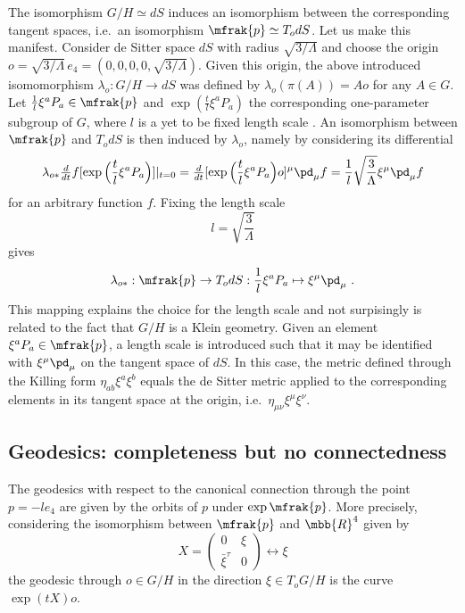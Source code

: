 \documentclass[11pt]{article}
\begin{document}
The isomorphism $G/H \simeq dS$ induces an isomorphism between 
the corresponding tangent spaces, i.e.~an isomorphism $\mfrak{p} 
\simeq T_odS$. Let us make this manifest. Consider de Sitter 
space $dS$ with radius $\sqrt{3/\Lambda}$ and choose the origin 
$o = \sqrt{3/\Lambda}\,e_4 = (0,0,0,0,\sqrt{3/\Lambda})$.  Given 
this origin, the above introduced isomomorphism $\lambda_o : G/H 
\to dS$ was defined by $\lambda_o(\pi(A)) = Ao$ for any $A \in 
G$.  Let $\tfrac{1}{l}\xi^a P_a \in \mfrak{p}$ and 
$\exp(\tfrac{t}{l}\xi^a P_a)$ the corresponding one-parameter 
subgroup of $G$, where $l$ is a yet to be fixed length scale 
\cite{Wise:2006sm}. An isomorphism between $\mfrak{p}$ and 
$T_odS$ is then induced by $\lambda_o$, namely by considering its 
differential
%
\begin{displaymath}
	\lambda_{o\ast}\tfrac{d}{dt}f[\exp\Big(\frac{t}{l}\xi^a 
	P_a\Big)]|_{t=0} = \tfrac{d}{dt}[\exp\Big(\frac{t}{l}\xi^a 
	P_a\Big)o]^\mu \pd_\mu f = 
	\frac{1}{l}\sqrt{\frac{3}{\Lambda}}\xi^\mu\pd_\mu f
\end{displaymath}
for an arbitrary function $f$. Fixing the length scale 
\cite{Wise:2006sm}
\begin{displaymath}
	l = \sqrt{\frac{3}{\Lambda}}
\end{displaymath}
gives
%
\begin{equation}
	\lambda_{o\ast} : \mfrak{p} \to T_odS : \frac{1}{l}\xi^a P_a 
	\mapsto \xi^\mu \pd_\mu~.
\end{equation}
This mapping explains the choice for the length scale and not 
surpisingly is related to the fact that $G/H$ is a Klein 
geometry. Given an element $\xi^a P_a \in \mfrak{p}$, a length 
scale is introduced such that it may be identified with $\xi^\mu 
\pd_\mu$ on the tangent space of $dS$. In this case, the metric 
defined through the Killing form $\eta_{ab}\xi^a\xi^b$ equals the 
de Sitter metric applied to the corresponding elements in its 
tangent space at the origin, i.e.\ $\eta_{\mu\nu}\xi^\mu\xi^\nu$.  

\subsection{Geodesics: completeness but no connectedness}

The geodesics with respect to the canonical connection through 
the point $p=-le_4$ are given by the orbits of $p$ under $\exp 
\mfrak{p}$. More precisely, considering the isomorphism between 
$\mfrak{p}$ and $\mbb{R}^4$ given by
%
\begin{displaymath}
	X=
	\begin{pmatrix}
		0								& \xi \\
		\bar{\xi}^\tau	& 0
	\end{pmatrix}\leftrightarrow
	\xi
\end{displaymath}
the geodesic through $o \in G/H$ in the direction $\xi \in 
T_oG/H$ is the curve $\exp (tX) o$.
\end{document}
